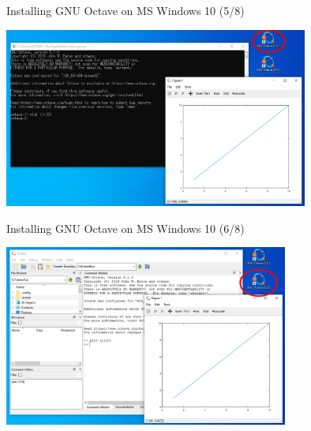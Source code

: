 \begin{frame}{Installing GNU Octave on MS Windows 10 (5/8)}
\begin{center}
\includegraphics[width=0.75\textwidth]{res/ms_windows/win_octave_cli_plot.png}
\end{center}
\end{frame}



\begin{frame}{Installing GNU Octave on MS Windows 10 (6/8)}
\begin{center}
\includegraphics[width=0.7\textwidth]{res/ms_windows/win_octave_gui_plot.png}
\end{center}
\end{frame}



